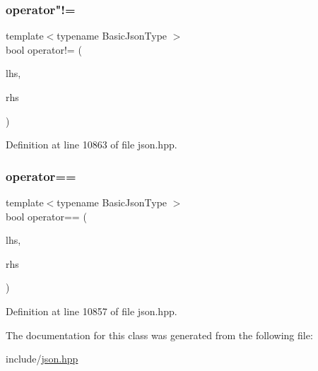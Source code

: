 \subsubsection{\texorpdfstring{operator"!=}{operator!=}}
{\footnotesize\ttfamily template$<$typename Basic\+Json\+Type $>$ \\
bool operator!= (\begin{DoxyParamCaption}\item[{\hyperlink{classnlohmann_1_1json__pointer}{json\+\_\+pointer}$<$ Basic\+Json\+Type $>$ const \&}]{lhs,  }\item[{\hyperlink{classnlohmann_1_1json__pointer}{json\+\_\+pointer}$<$ Basic\+Json\+Type $>$ const \&}]{rhs }\end{DoxyParamCaption})\hspace{0.3cm}{\ttfamily [friend]}}



Definition at line 10863 of file json.\+hpp.

\mbox{\label{classnlohmann_1_1json__pointer_a4667ef558c8c3f8a646bfda0c6654653}} 
\subsubsection{\texorpdfstring{operator==}{operator==}}
{\footnotesize\ttfamily template$<$typename Basic\+Json\+Type $>$ \\
bool operator== (\begin{DoxyParamCaption}\item[{\hyperlink{classnlohmann_1_1json__pointer}{json\+\_\+pointer}$<$ Basic\+Json\+Type $>$ const \&}]{lhs,  }\item[{\hyperlink{classnlohmann_1_1json__pointer}{json\+\_\+pointer}$<$ Basic\+Json\+Type $>$ const \&}]{rhs }\end{DoxyParamCaption})\hspace{0.3cm}{\ttfamily [friend]}}



Definition at line 10857 of file json.\+hpp.



The documentation for this class was generated from the following file\+:\begin{DoxyCompactItemize}
\item 
include/\hyperlink{json_8hpp}{json.\+hpp}\end{DoxyCompactItemize}
